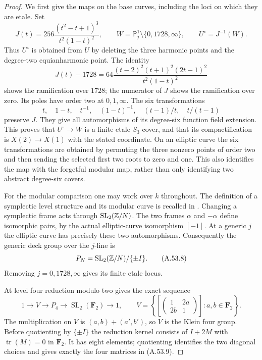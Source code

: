 \begin{proof}
We first give the maps on the base curves, including the loci on
which they are etale.  Set
\[
 J(t)=256\frac{(t^2-t+1)^3}{t^2(1-t)^2},\qquad
 W=\mathbb P^1_j\setminus\{0,1728,\infty\},\qquad
 U^\circ=J^{-1}(W).
\tag{A.53.5}
\]
Thus $U^\circ$ is obtained from $U$ by deleting the three harmonic
points and the degree-two equianharmonic point.  The identity
\[
 J(t)-1728=
 64\frac{(t-2)^2(t+1)^2(2t-1)^2}{t^2(1-t)^2}
\tag{A.53.6}
\]
shows the ramification over $1728$; the numerator of $J$ shows the
ramification over zero.  Its poles have order two at $0,1,\infty$.
The six transformations
\[
 t,\quad 1-t,\quad t^{-1},\quad (1-t)^{-1},\quad
 (t-1)/t,\quad t/(t-1)
\tag{A.53.7}
\]
preserve $J$.  They give all automorphisms of its degree-six function
field extension.  This proves that $U^\circ\to W$ is a finite etale
$S_3$-cover, and that its compactification is $X(2)\to X(1)$ with the
stated coordinate.  On an elliptic curve the six transformations
are obtained by permuting the three nonzero points of order two and
then sending the selected first two roots to zero and one.  This
also identifies the map with the forgetful modular map, rather than
only identifying two abstract degree-six covers.

For the modular comparison one may work over $k$ throughout.
The definition of a symplectic level structure and its modular
curve is recalled in \cite[Section 8, pp.~99--100]{LegMilneMF2017}.
Changing a symplectic frame acts through
$\operatorname{SL}_2(\mathbb Z/N)$.  The two frames $\alpha$ and $-\alpha$
define isomorphic pairs, by the actual elliptic-curve isomorphism
$[-1]$.  At a generic $j$ the elliptic curve has precisely these
two automorphisms.  Consequently the generic deck group over the
$j$-line is
\[
 P_N=\operatorname{SL}_2(\mathbb Z/N)/\{\pm I\}.
\tag{A.53.8}
\]
Removing $j=0,1728,\infty$ gives its finite etale locus.

At level four reduction modulo two gives the exact sequence
\[
 1\longrightarrow V\longrightarrow P_4
   \longrightarrow \operatorname{SL}_2(\mathbf F_2)
   \longrightarrow1,
 \qquad
 V=\left\{\left[\begin{pmatrix}1&2a\\2b&1\end{pmatrix}\right]
                 :a,b\in\mathbf F_2\right\}.
\tag{A.53.9}
\]
The multiplication on $V$ is $(a,b)+(a',b')$, so $V$ is the Klein
four group.  Before quotienting by $\{\pm I\}$ the reduction
kernel consists of $I+2M$ with $\operatorname{tr}(M)=0$ in
$\mathbf F_2$.  It has eight elements; quotienting identifies the
two diagonal choices and gives exactly the four matrices in
(A.53.9).


\end{proof}
